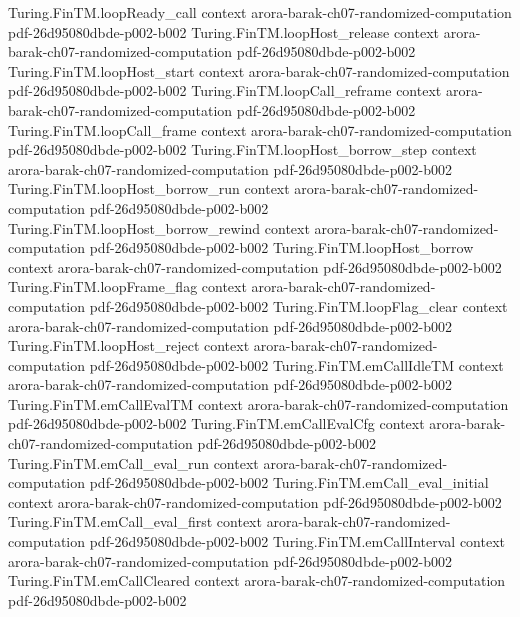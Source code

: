 \begin{theorem}
  {Turing.FinTM.loopReady_call}
  {context}
  {arora-barak-ch07-randomized-computation}
  {pdf-26d95080dbde-p002-b002}
\proofstep
  {Turing.FinTM.loopHost_release}
  {context}
  {arora-barak-ch07-randomized-computation}
  {pdf-26d95080dbde-p002-b002}
\proofstep
  {Turing.FinTM.loopHost_start}
  {context}
  {arora-barak-ch07-randomized-computation}
  {pdf-26d95080dbde-p002-b002}
\proofstep
  {Turing.FinTM.loopCall_reframe}
  {context}
  {arora-barak-ch07-randomized-computation}
  {pdf-26d95080dbde-p002-b002}
\proofstep
  {Turing.FinTM.loopCall_frame}
  {context}
  {arora-barak-ch07-randomized-computation}
  {pdf-26d95080dbde-p002-b002}
\proofstep
  {Turing.FinTM.loopHost_borrow_step}
  {context}
  {arora-barak-ch07-randomized-computation}
  {pdf-26d95080dbde-p002-b002}
\proofstep
  {Turing.FinTM.loopHost_borrow_run}
  {context}
  {arora-barak-ch07-randomized-computation}
  {pdf-26d95080dbde-p002-b002}
\proofstep
  {Turing.FinTM.loopHost_borrow_rewind}
  {context}
  {arora-barak-ch07-randomized-computation}
  {pdf-26d95080dbde-p002-b002}
\proofstep
  {Turing.FinTM.loopHost_borrow}
  {context}
  {arora-barak-ch07-randomized-computation}
  {pdf-26d95080dbde-p002-b002}
\proofstep
  {Turing.FinTM.loopFrame_flag}
  {context}
  {arora-barak-ch07-randomized-computation}
  {pdf-26d95080dbde-p002-b002}
\proofstep
  {Turing.FinTM.loopFlag_clear}
  {context}
  {arora-barak-ch07-randomized-computation}
  {pdf-26d95080dbde-p002-b002}
\proofstep
  {Turing.FinTM.loopHost_reject}
  {context}
  {arora-barak-ch07-randomized-computation}
  {pdf-26d95080dbde-p002-b002}
\proofstep
  {Turing.FinTM.emCallIdleTM}
  {context}
  {arora-barak-ch07-randomized-computation}
  {pdf-26d95080dbde-p002-b002}
\proofstep
  {Turing.FinTM.emCallEvalTM}
  {context}
  {arora-barak-ch07-randomized-computation}
  {pdf-26d95080dbde-p002-b002}
\proofstep
  {Turing.FinTM.emCallEvalCfg}
  {context}
  {arora-barak-ch07-randomized-computation}
  {pdf-26d95080dbde-p002-b002}
\proofstep
  {Turing.FinTM.emCall_eval_run}
  {context}
  {arora-barak-ch07-randomized-computation}
  {pdf-26d95080dbde-p002-b002}
\proofstep
  {Turing.FinTM.emCall_eval_initial}
  {context}
  {arora-barak-ch07-randomized-computation}
  {pdf-26d95080dbde-p002-b002}
\proofstep
  {Turing.FinTM.emCall_eval_first}
  {context}
  {arora-barak-ch07-randomized-computation}
  {pdf-26d95080dbde-p002-b002}
\proofstep
  {Turing.FinTM.emCallInterval}
  {context}
  {arora-barak-ch07-randomized-computation}
  {pdf-26d95080dbde-p002-b002}
\proofstep
  {Turing.FinTM.emCallCleared}
  {context}
  {arora-barak-ch07-randomized-computation}
  {pdf-26d95080dbde-p002-b002}

\end{theorem}
